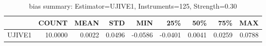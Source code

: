 \begin{table}[ht]
\centering
\caption{bias summary: Estimator=UJIVE1, Instruments=125, Strength=0.30}
\begin{tabular}{lrrrrrrrr}
\toprule
 & COUNT & MEAN & STD & MIN & 25\% & 50\% & 75\% & MAX \\
\midrule
UJIVE1 & 10.0000 & 0.0022 & 0.0496 & -0.0586 & -0.0401 & 0.0041 & 0.0259 & 0.0788 \\
\bottomrule
\end{tabular}
\end{table}
